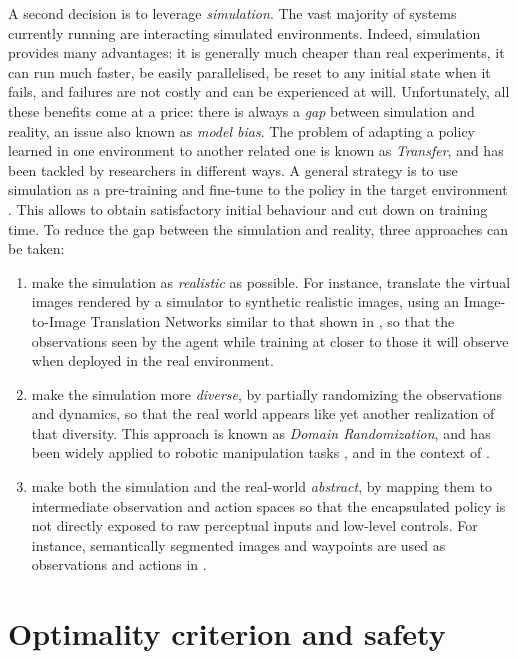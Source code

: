 A second decision is to leverage \emph{simulation}. The vast majority of  systems currently running are interacting simulated environments. Indeed, simulation provides many advantages: it is generally much cheaper than real experiments, it can run much faster, be easily parallelised, be reset to any initial state when it fails, and failures are not costly and can be experienced at will. Unfortunately, all these benefits come at a price: there is always a \emph{gap} between simulation and reality, an issue also known as \emph{model bias}. The problem of adapting a policy learned in one environment to another related one is known as \emph{Transfer}, and has been tackled by researchers in different ways. A general strategy is to use simulation as a pre-training and fine-tune to the policy in the target environment \citep{Liang2019}. This allows to obtain satisfactory initial behaviour and cut down on training time. To reduce the gap between the simulation and reality, three approaches can be taken:
\begin{enumerate}[label=(\roman*)]
	\item make the simulation as \textit{realistic} as possible. For instance, \citet{Pan2017} translate the virtual images rendered by a simulator to synthetic realistic images, using an Image-to-Image Translation Networks similar to that shown in , so that the observations seen by the agent while training at closer to those it will observe when deployed in the real environment.
	\item make the simulation more \textit{diverse}, by partially randomizing the observations and dynamics, so that the real world appears like yet another realization of that diversity. This approach is known as \emph{Domain Randomization}, and has been widely applied to robotic manipulation tasks \citep{Tobin2017,openai2019solving}, and in the context of  \citep{Prakash2019,Pouyanfar2019}.
	\item make both the simulation and the real-world \textit{abstract}, by mapping them to intermediate observation and action spaces so that the encapsulated policy is not directly exposed to raw perceptual inputs and low-level controls. For instance, semantically segmented images and waypoints are used as observations and actions in \citep{Mueller2018}.
\end{enumerate}


\section{Optimality criterion and safety}


